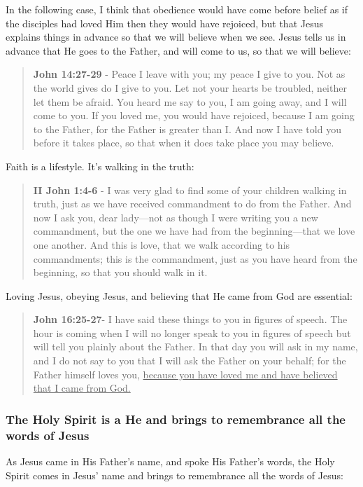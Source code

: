 \documentclass[11pt]{article}
\begin{document}
In the following case, I think that obedience would have come before belief as if the disciples had loved Him then they would have rejoiced, but that Jesus explains things in advance so that we will believe when we see. Jesus tells us in advance that He goes to the Father, and will come to us, so that we will believe:

\begin{quote}
\textbf{John 14:27-29} - Peace I leave with you; my peace I give to you. Not as the world gives do I give to you. Let not your hearts be troubled, neither let them be afraid. You heard me say to you, I am going away, and I will come to you. If you loved me, you would have rejoiced, because I am going to the Father, for the Father is greater than I. And now I have told you before it takes place, so that when it does take place you may believe.
\end{quote}

Faith is a lifestyle. It's walking in the truth:

\begin{quote}
\textbf{II John 1:4-6} - I was very glad to find some of your children walking in truth, just as we have received commandment to do from the Father. And now I ask you, dear lady—not as though I were writing you a new commandment, but the one we have had from the beginning—that we love one another. And this is love, that we walk according to his commandments; this is the commandment, just as you have heard from the beginning, so that you should walk in it.
\end{quote}

Loving Jesus, obeying Jesus, and believing that He came from God are essential:

\begin{quote}
\textbf{John 16:25-27}- I have said these things to you in figures of speech. The hour is coming when I will no longer speak to you in figures of speech but will tell you plainly about the Father. In that day you will ask in my name, and I do not say to you that I will ask the Father on your behalf; for the Father himself loves you, \uline{because you have loved me and have believed that I came from God.}
\end{quote}

\subsubsection{The Holy Spirit is a He and brings to remembrance all the words of Jesus}
\label{sec:org045449c}
As Jesus came in His Father's name, and spoke His Father's words,
the Holy Spirit comes in Jesus' name and brings to remembrance all the words of Jesus:
\end{document}
